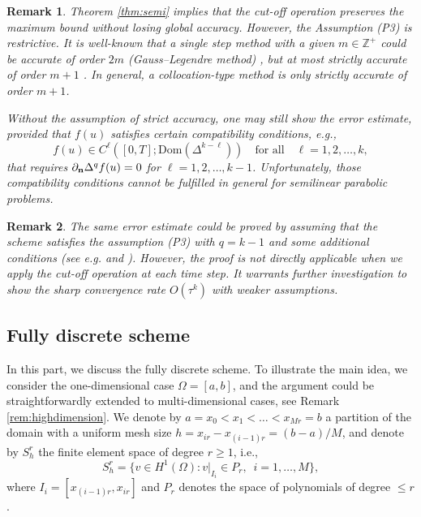 \documentclass[10pt,final,leqno,onefignum,onetabnum]{siamltex}%
\newtheorem{remark}{Remark}[section]
\begin{document}
\begin{remark}\label{remark:p3}
Theorem \ref{thm:semi} implies that the cut-off operation preserves the maximum bound
without losing global accuracy. However, the Assumption (P3) is restrictive. It is well-known that a single step method
with a given $m \in \mathbb{Z}^+$ could be accurate of order $2m$ (Gauss--Legendre method) \cite[Section 2.2]{Ehle:thesis},
but at most strictly accurate of order $m+1$ \cite[Lemma 5]{BrennerCrouzeixThomee:1982}.
In general, a collocation-type method is only strictly accurate of order $m+1$.

Without the assumption of strict accuracy,  one may still show the error estimate,
provided that $f(u)$ satisfies certain compatibility conditions, e.g.,
$$ f(u) \in C^{\ell}([0,T]; \text{Dom}(\Delta^{k-\ell}))\quad \text{for all} \quad \ell=1,2,\ldots,k,$$
that requires
 $\partial_{\bf n} \Delta^q f(u) = 0$ for $\ell=1,2,\ldots,k-1$.
Unfortunately, those compatibility conditions cannot be fulfilled in general for semilinear parabolic problems.
\end{remark}

\begin{remark}\label{remark:p3-2}
The same error estimate could be proved by
assuming that the scheme satisfies the assumption (P3)
with $q=k-1$ and some additional conditions
(see e.g. \cite[Theorem 8.4]{Thomee:2006} and \cite{OstermannRoche:1992}).
However, the proof is not directly applicable when we apply the cut-off operation at each time step.
It warrants further investigation to show the sharp convergence rate $O(\tau^k)$ with weaker assumptions.
\end{remark}



\subsection{Fully discrete scheme}\label{ssec:fully}
In this part, we discuss the fully discrete scheme. To illustrate the
main idea, we consider the one-dimensional case $\Omega=[a,b]$,
and the argument could be straightforwardly extended to multi-dimensional cases, see Remark \ref{rem:highdimension}.
We denote by $a=x_0<x_{1}<\dots<x_{Mr}=b$ a partition of the domain with a uniform mesh size $h=x_{ir} - x_{(i-1)r} = (b-a)/M$,
and denote by $S_h^r$ the finite element space of degree $r\ge 1$, i.e.,
$$
S_h^r=\{v\in H^1(\Omega): v|_{I_i}\in P_r,\,\,\, i=1,\dots,M\} ,
$$
where $I_i=[x_{(i-1)r},x_{ir}]$ and $P_r$ denotes the space of polynomials of degree $\le r$.
\end{document}
